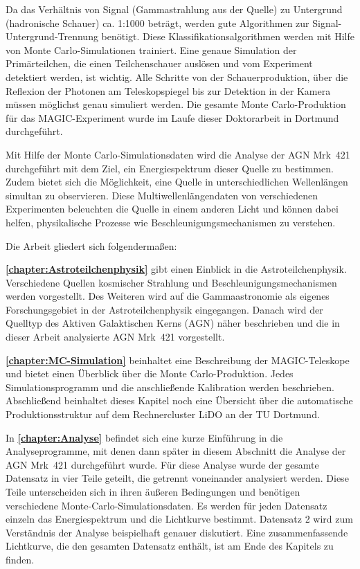 Da das Verhältnis von Signal (Gammastrahlung aus der Quelle) zu Untergrund (hadronische Schauer) ca. 1:1000 beträgt, werden gute Algorithmen zur Signal-Untergrund-Trennung benötigt.
Diese Klassifikationsalgorithmen werden mit Hilfe von Monte Carlo-Simulationen trainiert.
Eine genaue Simulation der Primärteilchen, die einen Teilchenschauer auslösen und vom Experiment detektiert werden, ist wichtig.
Alle Schritte von der Schauerproduktion, über die Reflexion der Photonen am Teleskopspiegel bis zur Detektion in der Kamera müssen möglichst genau simuliert werden.
Die gesamte Monte Carlo-Produktion für das MAGIC-Experiment wurde im Laufe dieser Doktorarbeit in Dortmund durchgeführt.

Mit Hilfe der Monte Carlo-Simulationsdaten wird die Analyse der AGN Mrk~421 durchgeführt mit dem Ziel, ein Energiespektrum dieser Quelle zu bestimmen.
Zudem bietet sich die Möglichkeit, eine Quelle in unterschiedlichen Wellenlängen simultan zu observieren.
Diese Multiwellenlängendaten von verschiedenen Experimenten beleuchten die Quelle in einem anderen Licht und können dabei helfen, physikalische Prozesse wie Beschleunigungsmechanismen zu verstehen.\newline

Die Arbeit gliedert sich folgendermaßen:

\textbf{\autoref{chapter:Astroteilchenphysik}} gibt einen Einblick in die Astroteilchenphysik. 
Verschiedene Quellen kosmischer Strahlung und Beschleunigungsmechanismen werden vorgestellt. 
Des Weiteren wird auf die Gammaastronomie als eigenes Forschungsgebiet in der Astroteilchenphysik eingegangen. 
Danach wird der Quelltyp des Aktiven Galaktischen Kerns (AGN) näher beschrieben und die in dieser Arbeit analysierte AGN Mrk~421 vorgestellt.

\textbf{\autoref{chapter:MC-Simulation}} beinhaltet eine Beschreibung der MAGIC-Teleskope und bietet einen Überblick über die Monte Carlo-Produktion.
Jedes Simulationsprogramm und die anschließende Kalibration werden beschrieben.
Abschließend beinhaltet dieses Kapitel noch eine Übersicht über die automatische Produktionsstruktur auf dem Rechnercluster LiDO an der TU Dortmund.

In \textbf{\autoref{chapter:Analyse}} befindet sich eine kurze Einführung in die Analyseprogramme, mit denen dann später in diesem Abschnitt die Analyse der AGN Mrk~421 durchgeführt wurde.
Für diese Analyse wurde der gesamte Datensatz in vier Teile geteilt, die getrennt voneinander analysiert werden.
Diese Teile unterscheiden sich in ihren äußeren Bedingungen und benötigen verschiedene Monte-Carlo-Simulationsdaten.
Es werden für jeden Datensatz einzeln das Energiespektrum und die Lichtkurve bestimmt.
Datensatz 2 wird zum Verständnis der Analyse beispielhaft genauer diskutiert.
Eine zusammenfassende Lichtkurve, die den gesamten Datensatz enthält, ist am Ende des Kapitels zu finden.


